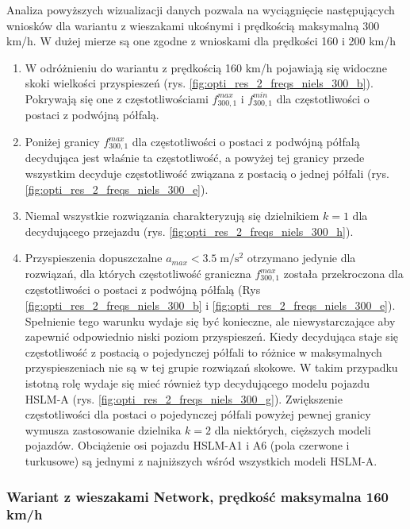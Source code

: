 Analiza powyższych wizualizacji danych pozwala na wyciągnięcie następujących wniosków dla wariantu z wieszakami ukośnymi i prędkością maksymalną 300 km/h. W dużej mierze są one zgodne z wnioskami dla prędkości 160 i 200 km/h
\begin{enumerate}
	
	\item W odróżnieniu do wariantu z prędkością 160 km/h pojawiają się widoczne skoki wielkości przyspieszeń (rys. \ref{fig:opti_res_2_freqs_niels_300_b}). Pokrywają się one z częstotliwościami $f_{300,1}^{max}$ i $f_{300,1}^{min}$ dla częstotliwości o postaci z podwójną półfalą.
	
	\item Poniżej granicy $f_{300,1}^{max}$ dla częstotliwości o postaci z podwójną półfalą decydująca jest właśnie ta częstotliwość, a powyżej tej granicy przede wszystkim decyduje częstotliwość związana z postacią o jednej półfali (rys. \ref{fig:opti_res_2_freqs_niels_300_e}).
	
	\item Niemal wszystkie rozwiązania charakteryzują się dzielnikiem $k=1$ dla decydującego przejazdu (rys. \ref{fig:opti_res_2_freqs_niels_300_h}). 
	
	\item Przyspieszenia dopuszczalne $a_{max}<3.5\;\mathrm{m/s^2}$ otrzymano jedynie dla rozwiązań, dla których częstotliwość graniczna $f_{300,1}^{max}$ została przekroczona dla częstotliwości o postaci z podwójną półfalą (Rys \ref{fig:opti_res_2_freqs_niels_300_b} i \ref{fig:opti_res_2_freqs_niels_300_e}). Spełnienie tego warunku wydaje się być konieczne, ale niewystarczające aby zapewnić odpowiednio niski poziom przyspieszeń. Kiedy decydująca staje się częstotliwość z postacią o pojedynczej półfali to różnice w maksymalnych przyspieszeniach nie są w tej grupie rozwiązań skokowe. W takim przypadku istotną rolę wydaje się mieć również typ decydującego modelu pojazdu HSLM-A (rys. \ref{fig:opti_res_2_freqs_niels_300_g}). Zwiększenie częstotliwości dla postaci o pojedynczej półfali powyżej pewnej granicy wymusza zastosowanie dzielnika $k=2$ dla niektórych, cięższych modeli pojazdów. Obciążenie osi pojazdu HSLM-A1 i A6 (pola czerwone i turkusowe) są jednymi z najniższych wśród wszystkich modeli HSLM-A.
	
\end{enumerate}
\vfill





\subsubsection{Wariant z wieszakami Network, prędkość maksymalna 160 km/h}

